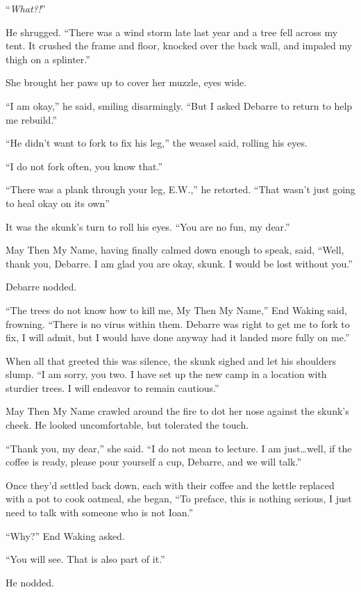 ``\emph{What?!}''

He shrugged. ``There was a wind storm late last year and a tree fell across my tent. It crushed the frame and floor, knocked over the back wall, and impaled my thigh on a splinter.''

She brought her paws up to cover her muzzle, eyes wide.

``I am okay,'' he said, smiling disarmingly. ``But I asked Debarre to return to help me rebuild.''

``He didn't want to fork to fix his leg,'' the weasel said, rolling his eyes.

``I do not fork often, you know that.''

``There was a plank through your leg, E.W.,'' he retorted. ``That wasn't just going to heal okay on its own''

It was the skunk's turn to roll his eyes. ``You are no fun, my dear.''

May Then My Name, having finally calmed down enough to speak, said, ``Well, thank you, Debarre. I am glad you are okay, skunk. I would be lost without you.''

Debarre nodded.

``The trees do not know how to kill me, My Then My Name,'' End Waking said, frowning. ``There is no virus within them. Debarre was right to get me to fork to fix, I will admit, but I would have done anyway had it landed more fully on me.''

When all that greeted this was silence, the skunk sighed and let his shoulders slump. ``I am sorry, you two. I have set up the new camp in a location with sturdier trees. I will endeavor to remain cautious.''

May Then My Name crawled around the fire to dot her nose against the skunk's cheek. He looked uncomfortable, but tolerated the touch.

``Thank you, my dear,'' she said. ``I do not mean to lecture. I am just\ldots well, if the coffee is ready, please pour yourself a cup, Debarre, and we will talk.''

Once they'd settled back down, each with their coffee and the kettle replaced with a pot to cook oatmeal, she began, ``To preface, this is nothing serious, I just need to talk with someone who is not Ioan.''

``Why?'' End Waking asked.

``You will see. That is also part of it.''

He nodded.

